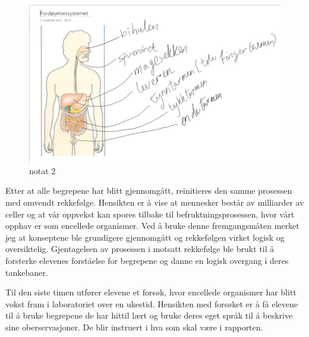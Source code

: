 \documentclass[main.tex]{subfiles}
\begin{document}
\begin{figure}[h!]
\includegraphics[scale = 0.6]{../figures/onenote_fordoyelse.png}
\caption{notat 2}
\label{fig:notat2}
\end{figure}

Etter at alle begrepene har blitt gjennomgått, reinitieres den samme prosessen med omvendt rekkefølge.
Hensikten er å vise at mennesker består av milliarder av celler og 
at vår oppvekst kan spores tilbake til befruktningsprosessen, hvor vårt opphav er som
encellede organismer. Ved å bruke denne fremgangsmåten merket jeg at konseptene ble grundigere
gjennomgått og rekkefølgen virket logisk og oversiktelig. Gjentagelsen av prosessen i motsatt
rekkefølge ble brukt til å forsterke elevenes forståelse for begrepene og danne en logisk 
overgang i deres tankebaner. 
\newline

Til den siste timen utfører elevene et forsøk, hvor encellede organismer har blitt vokst fram 
i laboratoriet over en ukestid. Hensikten med forsøket er å få elevene til å bruke begrepene 
de har hittil lært og bruke deres eget språk til å beskrive sine oberservasjoner. De blir
instruert i hva som skal være i rapporten.

\end{document}
